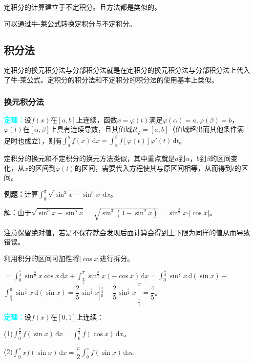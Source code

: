\documentclass[UTF8, 12pt]{ctexart}
\begin{document}
定积分的计算建立于不定积分。且方法都是类似的。

可以通过牛-莱公式转换定积分与不定积分。

\subsection{积分法}

定积分的换元积分法与分部积分法就是在定积分的换元积分法与分部积分法上代入了牛-莱公式。定积分的积分法和不定积分的积分法的使用基本上类似。

\subsubsection{换元积分法}

\textcolor{aqua}{\textbf{定理：}}设$f(x)$在$[a,b]$上连续，函数$x=\varphi(t)$满足$\varphi(\alpha)=a,\varphi(\beta)=b$，$\varphi(t)$在$[\alpha,\beta]$上具有连续导数，且其值域$R_\varphi=[a,b]$（值域超出而其他条件满足时也成立），则有$\int_a^bf(x)\,\textrm{d}x=\int_\alpha^\beta f[\varphi(t)]\varphi'(t)\,\textrm{d}t$。

定积分的换元和不定积分的换元方法类似，其中重点就是$a$到$\alpha$，$b$到$\beta$的区间变化，从$x$的区间到$\varphi(t)$的区间，需要代入方程使其与原区间相等，从而得到$t$的区间。

\textbf{例题：}计算$\int_0^\pi\sqrt{\sin^3x-\sin^5x}\,\textrm{d}x$。

解：由于$\sqrt{\sin^3x-\sin^5x}=\sqrt{\sin^3(1-\sin^2x)}=\sin^\frac{3}{2}x\cdot\vert\cos x\vert$。

注意保留绝对值，若是不保存就会发现后面计算会得到上下限为同样的值从而导致错误。

利用积分的区间可加性将$\vert\cos x\vert$进行拆分。

$=\int_0^\frac{\pi}{2}\sin^\frac{3}{2}x\cos x\,\textrm{d}x+\int_\frac{\pi}{2}^\pi\sin^\frac{3}{2}x(-\cos x)\,\textrm{d}x=\int_0^\frac{\pi}{2}\sin^\frac{3}{2}x\,\textrm{d}(\sin x)-$\\$\int_\frac{\pi}{2}^\pi\sin^\frac{3}{2}x\,\textrm{d}(\sin x)=\dfrac{2}{5}\sin^\frac{5}{2}x|_0^\frac{\pi}{2}-\dfrac{2}{5}\sin^\frac{5}{2}x|_\frac{\pi}{2}^\pi=\dfrac{4}{5}$。

\textcolor{aqua}{\textbf{定理：}}设$f(x)$在$[0,1]$上连续：

(1)$\int_0^\frac{\pi}{2}f(\sin x)\,\textrm{d}x=\int_0^\frac{\pi}{2}f(\cos x)\,\textrm{d}x$。

(2)$\int_0^\pi xf(\sin x)\,\textrm{d}x=\dfrac{\pi}{2}\int_0^\pi f(\sin x)\,\textrm{d}x$。
\end{document}
